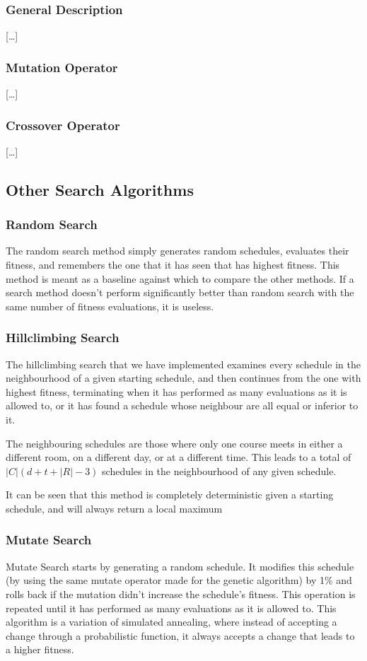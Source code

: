 \documentclass[letterpaper]{article}
\begin{document}
    \subsubsection{General Description}
      [\ldots]
    \subsubsection{Mutation Operator}
      [\ldots]
    \subsubsection{Crossover Operator}
      [\ldots]
  \subsection{Other Search Algorithms}
    \subsubsection{Random Search}
      The random search method simply generates random schedules, evaluates their fitness,
      and remembers the one that it has seen that has highest fitness. This method is meant
      as a baseline against which to compare the other methods. If a search method doesn't
      perform significantly better than random search with the same number of fitness
      evaluations, it is useless.
      
    \subsubsection{Hillclimbing Search}
      The hillclimbing search that we have implemented examines every schedule in the
      neighbourhood of a given starting schedule, and then continues from the one with
      highest fitness, terminating when it has performed as many evaluations as it is allowed
      to, or it has found a schedule whose neighbour are all equal or inferior to it.
      
      The neighbouring schedules are those where only one course meets in either a different
      room, on a different day, or at a different time. This leads to a total of
      $ |C|(d+t+|R|-3) $ schedules in the neighbourhood of any given schedule.
      
      It can be seen that this method is completely deterministic given a starting schedule,
      and will always return a local maximum

    \subsubsection{Mutate Search}
      Mutate Search starts by generating a random schedule. It modifies this schedule (by
      using the same mutate operator made for the genetic algorithm) by 1\% and rolls back if
      the mutation didn't increase the schedule's fitness. This operation is repeated until it has
      performed as many evaluations as it is allowed to.
      This algorithm is a variation of simulated annealing, where instead of accepting a change
      through a probabilistic function, it always accepts a change that leads to a higher fitness.
\end{document}
